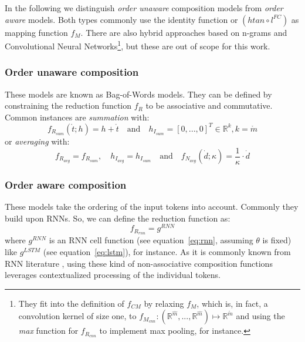 In the following we distinguish \textit{order unaware} composition models from \textit{order aware} models. Both types commonly use the identity function or $(htan \circ l^{FC})$ as mapping function $f_M$. There are also hybrid approaches based on n-grams and Convolutional Neural Networks\footnote{They fit into the definition of $f_{CM}$ by relaxing $f_M$, which is, in fact, a convolution kernel of size one, to $f_{M_{cnn}}: (\mathbb{R}^{\hat{m}}, ... ,\mathbb{R}^{\hat{m}}) \mapsto \mathbb{R}^{\mathring{m}}$ and using the \textit{max} function for $f_{R_{cnn}}$ to implement max pooling, for instance.}, but these are out of scope for this work.

\subsubsection*{Order unaware composition} 
These models are known as Bag-of-Words models. They can be defined by constraining the reduction function $f_R$ to be associative and commutative. Common instances are \textit{summation} with:
\begin{equation}
f_{R_{sum}}(\mathring{t}; h) = h + \mathring{t} \quad \text{and} \quad h_{I_{sum}} = [0, ..., 0]^T \in \mathbb{R}^k, k = \mathring{m}
\end{equation}
or \textit{averaging} with: 
\begin{equation}
f_{R_{avg}} = f_{R_{sum}}, \quad h_{I_{avg}} = h_{I_{sum}} \quad \text{and} \quad f_{N_{avg}}(\dot{d}; \kappa) = \frac{1}{\kappa} \cdot \dot{d}
\end{equation}

\subsubsection*{Order aware composition} \label{subsec:order_aware_composition}
These models take the ordering of the input tokens into account. Commonly they build upon \acl{RNN}s. So, we can define the reduction function as:
\begin{equation}
f_{R_{rnn}} = g^{RNN}
\end{equation}
where $g^{RNN}$ is an \ac{RNN} cell function (see equation~\eqref{eq:rnn}, assuming $\theta$ is fixed) like $g^{LSTM}$ (see equation~\eqref{eq:lstm}), for instance. As it is commonly known from \ac{RNN} literature , using these kind of non-associative composition functions leverages  contextualized processing of the individual tokens.

